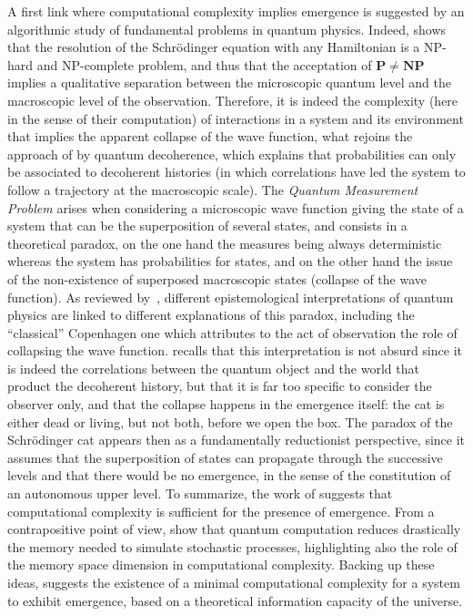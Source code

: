 \documentclass[graybox]{svmult}
\begin{document}
A first link where computational complexity implies emergence is suggested by an algorithmic study of fundamental problems in quantum physics. Indeed, \cite{2014arXiv1403.7686B} shows that the resolution of the Schrödinger equation with any Hamiltonian is a NP-hard and NP-complete problem, and thus that the acceptation of $\mathbf{P}\neq\mathbf{NP}$ implies a qualitative separation between the microscopic quantum level and the macroscopic level of the observation. Therefore, it is indeed the complexity (here in the sense of their computation) of interactions in a system and its environment that implies the apparent collapse of the wave function, what rejoins the approach of \cite{gell1996quantum} by quantum decoherence, which explains that probabilities can only be associated to decoherent histories (in which correlations have led the system to follow a trajectory at the macroscopic scale). The \emph{Quantum Measurement Problem} arises when considering a microscopic wave function giving the state of a system that can be the superposition of several states, and consists in a theoretical paradox, on the one hand the measures being always deterministic whereas the system has probabilities for states, and on the other hand the issue of the non-existence of superposed macroscopic states (collapse of the wave function). As reviewed by~\cite{schlosshauer2005decoherence}, different epistemological interpretations of quantum physics are linked to different explanations of this paradox, including the ``classical'' Copenhagen one which attributes to the act of observation the role of collapsing the wave function. \cite{gell1996quantum} recalls that this interpretation is not absurd since it is indeed the correlations between the quantum object and the world that product the decoherent history, but that it is far too specific to consider the observer only, and that the collapse happens in the emergence itself: the cat is either dead or living, but not both, before we open the box. The paradox of the Schrödinger cat appears then as a fundamentally reductionist perspective, since it assumes that the superposition of states can propagate through the successive levels and that there would be no emergence, in the sense of the constitution of an autonomous upper level. To summarize, the work of \cite{2014arXiv1403.7686B} suggests that computational complexity is sufficient for the presence of emergence. From a contrapositive point of view, \cite{2017arXiv170404231E} show that quantum computation reduces drastically the memory needed to simulate stochastic processes, highlighting also the role of the memory space dimension in computational complexity. Backing up these ideas, \cite{davies2004emergent} suggests the existence of a minimal computational complexity for a system to exhibit emergence, based on a theoretical information capacity of the universe.
\end{document}

